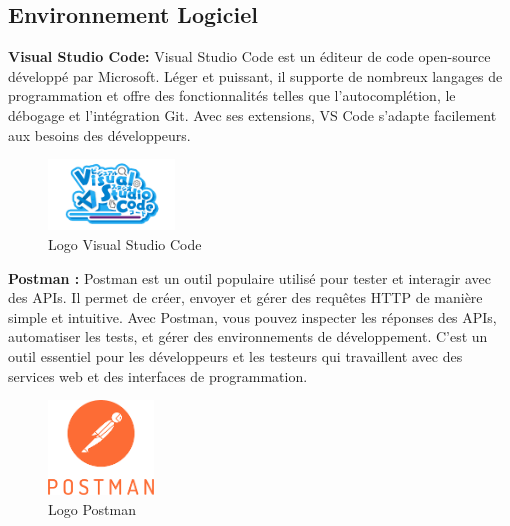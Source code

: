 \subsection{Environnement Logiciel}
 {\bf{ Visual Studio Code:}}
 Visual Studio Code est un éditeur de code open-source développé par Microsoft. Léger et puissant, il supporte de nombreux langages de programmation et offre des fonctionnalités telles que l'autocomplétion, le débogage et l'intégration Git. Avec ses extensions, VS Code s’adapte facilement aux besoins des développeurs.
 \begin{figure}[H]%
    \center%
    \includegraphics[width=0.3\textwidth]{pages/images/vscode.png}
    \caption{ Logo Visual Studio Code}\label{fig:test}%
  \end{figure}

\vspace{10mm}
 {\bf{Postman :}}
 Postman est un outil populaire utilisé pour tester et interagir avec des APIs. Il permet de créer, envoyer et gérer des requêtes HTTP de manière simple et intuitive. Avec Postman, vous pouvez inspecter les réponses des APIs, automatiser les tests, et gérer des environnements de développement. C’est un outil essentiel pour les développeurs et les testeurs qui travaillent avec des services web et des interfaces de programmation.
 \begin{figure}[H]%
    \center%
    \includegraphics[width=0.25\textwidth]{pages/images/postman.png}
    \caption{Logo Postman}\label{fig:test}%
  \end{figure}
 




